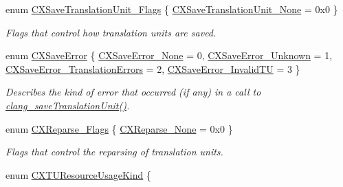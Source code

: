 \begin{DoxyCompactItemize}
\item 
enum \hyperlink{group__CINDEX__TRANSLATION__UNIT_ga4c8b0a3c559d14f80f78aba8c185e711}{C\+X\+Save\+Translation\+Unit\+\_\+\+Flags} \{ \hyperlink{group__CINDEX__TRANSLATION__UNIT_gga4c8b0a3c559d14f80f78aba8c185e711ad7f0f3242cc41d1b2e49fd0675031cf9}{C\+X\+Save\+Translation\+Unit\+\_\+\+None} = 0x0
 \}\begin{DoxyCompactList}\small\item\em Flags that control how translation units are saved. \end{DoxyCompactList}
\item 
enum \hyperlink{group__CINDEX__TRANSLATION__UNIT_ga7016a2cf0a256f239a8887d1251d5c23}{C\+X\+Save\+Error} \{ \hyperlink{group__CINDEX__TRANSLATION__UNIT_gga7016a2cf0a256f239a8887d1251d5c23aa14ffe92a7eb85cc68cfe7ef5460f3e6}{C\+X\+Save\+Error\+\_\+\+None} = 0, 
\hyperlink{group__CINDEX__TRANSLATION__UNIT_gga7016a2cf0a256f239a8887d1251d5c23a4e275864366f48819d043a30896210a8}{C\+X\+Save\+Error\+\_\+\+Unknown} = 1, 
\hyperlink{group__CINDEX__TRANSLATION__UNIT_gga7016a2cf0a256f239a8887d1251d5c23a9e4c3d094b8f2f39899bdefca43ce7f6}{C\+X\+Save\+Error\+\_\+\+Translation\+Errors} = 2, 
\hyperlink{group__CINDEX__TRANSLATION__UNIT_gga7016a2cf0a256f239a8887d1251d5c23a699cf0378b2e5417eaf51dc667accd41}{C\+X\+Save\+Error\+\_\+\+Invalid\+TU} = 3
 \}\begin{DoxyCompactList}\small\item\em Describes the kind of error that occurred (if any) in a call to {\ttfamily \hyperlink{group__CINDEX__TRANSLATION__UNIT_ga3abe9df81f9fef269d737d82720c1d33}{clang\+\_\+save\+Translation\+Unit()}}. \end{DoxyCompactList}
\item 
enum \hyperlink{group__CINDEX__TRANSLATION__UNIT_gabbc92e66e3a3b22de7ead07cf01678b9}{C\+X\+Reparse\+\_\+\+Flags} \{ \hyperlink{group__CINDEX__TRANSLATION__UNIT_ggabbc92e66e3a3b22de7ead07cf01678b9a72314cac7f41f5087a103175af95e7ce}{C\+X\+Reparse\+\_\+\+None} = 0x0
 \}\begin{DoxyCompactList}\small\item\em Flags that control the reparsing of translation units. \end{DoxyCompactList}
\item 
\mbox{\label{group__CINDEX__TRANSLATION__UNIT_ga13810240df7c205de04daac58f956396}} 
enum \hyperlink{group__CINDEX__TRANSLATION__UNIT_ga13810240df7c205de04daac58f956396}{C\+X\+T\+U\+Resource\+Usage\+Kind} \{ \newline

\end{DoxyCompactItemize}
